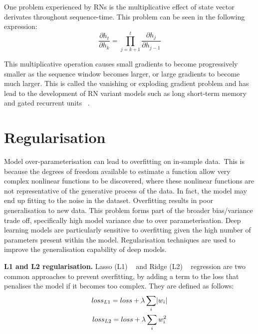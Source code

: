 \noindent One problem experienced by RNs is the multiplicative effect of state vector derivates throughout sequence-time. This problem can be seen in the following expression:
\begin{equation}
	\frac{\partial h_t} {\partial h_k} = \prod_{j=k+1}^t\frac{\partial h_j} {\partial h_{j-1}}
\end{equation}

\noindent This multiplicative operation causes small gradients to become progressively smaller as the sequence window becomes larger, or large gradients to become much larger. This is called the vanishing or exploding gradient problem and has lead to the development of RN variant models such as long short-term memory \unskip ~\citep{hochreiter1997long} and gated recurrent units \unskip ~\citep{cho2014learning}.



\section{Regularisation}

Model over-parameterisation can lead to overfitting on in-sample data.\ This is because the degrees of freedom available to estimate a function allow very complex nonlinear functions to be discovered, where these nonlinear functions are not representative of the generative process of the data. In fact, the model may end up fitting to the noise in the dataset. Overfitting results in poor generalisation to new data. This problem forms part of the broader bias/variance trade off, specifically high model variance due to over parameterisation. Deep learning models are particularly sensitive to overfitting given the high number of parameters present within the model. Regularisation techniques are used to improve the generalisation capability of deep models. \par

\noindent \textbf{L1 and L2 regularisation.} Lasso (L1) \unskip ~\citep{tibshirani1996regression} and Ridge (L2) \unskip ~\citep{hoerl1970ridge} regression are two common approaches to prevent overfitting, by adding a term to the loss that penalises the model if it becomes too complex. They are defined as follows:
\begin{subequations}
	\begin{gather}
		loss_{L1} = loss + \lambda\sum_i\abs{w_i}  \\
		loss_{L2} = loss + \lambda\sum_iw_i^2
	\end{gather}
\end{subequations}

